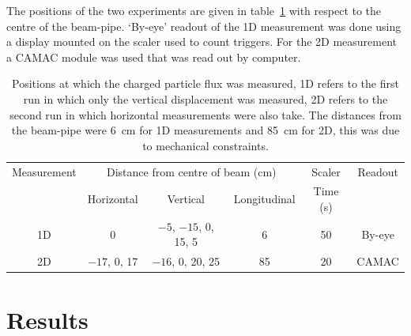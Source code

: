 The positions of the two experiments are given in table~\ref{tab:flux_setup} with respect to the centre of the beam-pipe. `By-eye' readout of the 1D measurement was done using a display mounted on the scaler used to count triggers. For the 2D measurement a CAMAC module was used that was read out by computer.
\begin{table}
  \begin{center}
    \begin{tabular}{c|c|c|c|c|c}
      Measurement  &  \multicolumn{3}{c|}{Distance from centre of beam (cm)}         &  Scaler    &  Readout \\
      &    Horizontal    &       Vertical              &  Longitudinal  &  Time (s)  &          \\
      \hline            
      1D           &  0               &  \(-5\), \(-15\), 0, 15, 5  &       6        &  50        & By-eye   \\
      2D           &  \(-17\), 0, 17  &  \(-16\), 0, 20, 25         &       85       &  20        & CAMAC    \\
    \end{tabular}
  \end{center}
  \caption{Positions at which the charged particle flux was measured, 1D refers to the first run in which only the vertical displacement was measured, 2D refers to the second run in which horizontal measurements were also take. The distances from the beam-pipe were 6~cm for 1D measurements and 85~cm for 2D, this was due to mechanical constraints.}
  \label{tab:flux_setup}
\end{table}

\section{Results} %
\label{sec:results}

